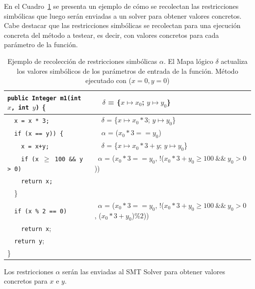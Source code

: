 \documentclass{llncs}
\begin{document}
\begin{itemize}
  En el Cuadro~\ref{path-conditions} se presenta un ejemplo de cómo se recolectan las restricciones simbólicas que luego serán enviadas a un solver para obtener valores concretos. Cabe destacar que las restricciones simbólicas se recolectan para una ejecución concreta del método a testear, es decir, con valores concretos para cada parámetro de la función.
  
      \begin{table}
	\centering
	\begin{tabular}{|m{5.5cm} | m{6cm}|}
	  \hline
	  \texttt{public Integer m1(int $x$, int $y$)} \{  & \ \ $\delta$ = \{$x \mapsto x_0$; $y \mapsto y_0$\}\\
	  \hline
	  \ \ \texttt{x = x * 3;}                          & \ \ $\delta$ = \{$x \mapsto x_0*3$; $y \mapsto y_0$\}\\
	  \hline
	  \ \ \texttt{if (x == y)) \{} 	                   & \ \ $\alpha$ = ($x_0*3 == y_0$)\\
	  \hline
	  \ \ \ \ \texttt{x = x+y;} 		           & \ \ $\delta$ = \{$x \mapsto x_0*3+y$; $y \mapsto y_0$\}\\
	  \hline
	  \ \ \ \ \texttt{if (x $\geq$ 100\ \&\&\ y > 0)}  & \ $\alpha$ = ($x_0*3 == y_0$, !($x_0*3+y_0 \geq 100\ \&\&\ y_0>0$))\\
	  \hline
	  \ \ \ \ \texttt{return x;} 			   & \\
	  \hline
	  \ \ \} 				  	   & \\
	  \hline
	  \ \ \texttt{if (x \% 2 == 0)}			   & \ $\alpha$ = ($x_0*3 == y_0$, !($x_0*3+y_0 \geq 100\ \&\&\ y_0>0$, ($x_0*3+y_0$)$\%2$))\\
	  \hline
	  \ \ \ \ \texttt{return x}; 			   & \\
	  \hline
	  \ \ \texttt{return y}; 		 	   & \\
	  \hline
	  \} 						   & \\
	  \hline
	\end{tabular}
	\caption{Ejemplo de recolección de restricciones simbólicas $\alpha$. El Mapa lógico $\delta$ actualiza los valores simbólicos de los
	parámetros de entrada de la función. Método ejecutado con ($x=0, y=0$)}
	\label{path-conditions}
      \end{table}
      Los restricciones $\alpha$ serán las enviadas al SMT Solver para obtener valores concretos para $x$ e $y$.
      
\end{itemize}


\end{document}
